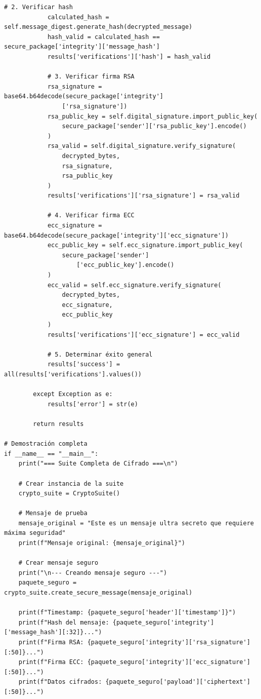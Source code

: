 \documentclass[12pt,a4paper]{article}
\begin{document}
\begin{lstlisting}[caption=Suite completa de cifrado integrando todas las funcionalidades]
            # 2. Verificar hash
            calculated_hash = self.message_digest.generate_hash(decrypted_message)
            hash_valid = calculated_hash == secure_package['integrity']['message_hash']
            results['verifications']['hash'] = hash_valid
            
            # 3. Verificar firma RSA
            rsa_signature = base64.b64decode(secure_package['integrity']
                ['rsa_signature'])
            rsa_public_key = self.digital_signature.import_public_key(
                secure_package['sender']['rsa_public_key'].encode()
            )
            rsa_valid = self.digital_signature.verify_signature(
                decrypted_bytes, 
                rsa_signature, 
                rsa_public_key
            )
            results['verifications']['rsa_signature'] = rsa_valid
            
            # 4. Verificar firma ECC
            ecc_signature = base64.b64decode(secure_package['integrity']['ecc_signature'])
            ecc_public_key = self.ecc_signature.import_public_key(
                secure_package['sender']
                    ['ecc_public_key'].encode()
            )
            ecc_valid = self.ecc_signature.verify_signature(
                decrypted_bytes, 
                ecc_signature, 
                ecc_public_key
            )
            results['verifications']['ecc_signature'] = ecc_valid
            
            # 5. Determinar éxito general
            results['success'] = all(results['verifications'].values())
            
        except Exception as e:
            results['error'] = str(e)
            
        return results

# Demostración completa
if __name__ == "__main__":
    print("=== Suite Completa de Cifrado ===\n")
    
    # Crear instancia de la suite
    crypto_suite = CryptoSuite()
    
    # Mensaje de prueba
    mensaje_original = "Este es un mensaje ultra secreto que requiere máxima seguridad"
    print(f"Mensaje original: {mensaje_original}")
    
    # Crear mensaje seguro
    print("\n--- Creando mensaje seguro ---")
    paquete_seguro = crypto_suite.create_secure_message(mensaje_original)
    
    print(f"Timestamp: {paquete_seguro['header']['timestamp']}")
    print(f"Hash del mensaje: {paquete_seguro['integrity']['message_hash'][:32]}...")
    print(f"Firma RSA: {paquete_seguro['integrity']['rsa_signature'][:50]}...")
    print(f"Firma ECC: {paquete_seguro['integrity']['ecc_signature'][:50]}...")
    print(f"Datos cifrados: {paquete_seguro['payload']['ciphertext'][:50]}...")
    

\end{lstlisting}
\end{document}
